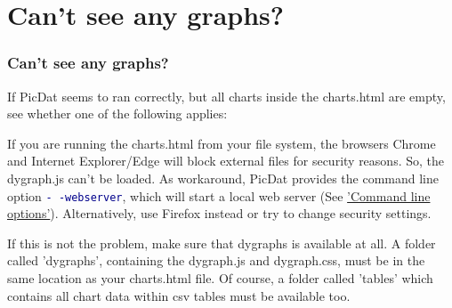 \documentclass[8pt]{beamer}
\begin{document}
\section{Can't see any graphs?}
\begin{frame}
\frametitle{Can't see any graphs?}
If PicDat seems to ran correctly, but all charts inside the charts.html are empty, see whether one of the following applies:
\bigskip

If you are running the charts.html from your file system, the browsers Chrome and Internet Explorer/Edge will block external files for security reasons. So, the dygraph.js can't be loaded. As workaround, PicDat provides the command line option \textcolor{darkblue}{\texttt{-\,-webserver}}, which will start a local web server (See \hyperref[options]{'Command line options'}). Alternatively, use Firefox instead or try to change security settings.
\bigskip

If this is not the problem, make sure that dygraphs is available at all. A folder called 'dygraphs', containing the dygraph.js and dygraph.css, must be in the same location as your charts.html file. Of course, a folder called 'tables' which contains all chart data within csv tables must be available too.
\end{frame}
\end{document}
